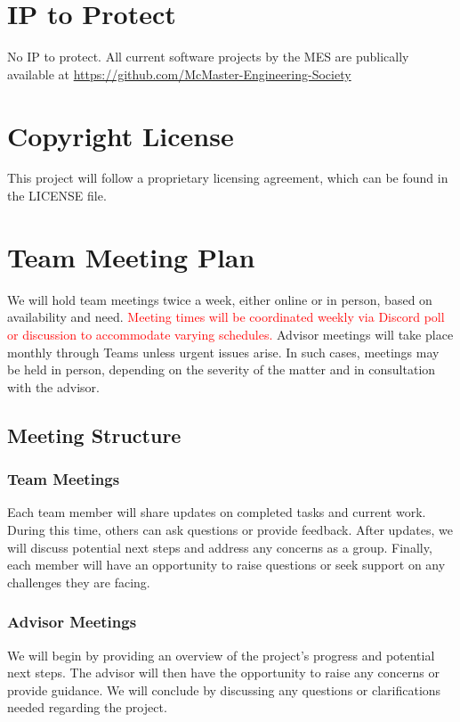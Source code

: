 \documentclass{article}
\begin{document}
\section{IP to Protect}
No IP to protect. All current software projects by the MES are publically available at \href{https://github.com/McMaster-Engineering-Society}{https://github.com/McMaster-Engineering-Society}


\section{Copyright License}
This project will follow a proprietary licensing agreement, which can be found in the LICENSE file.

\section{Team Meeting Plan}

We will hold team meetings twice a week, either online or in person, based on availability and need. \textcolor{red}{Meeting times will be coordinated weekly via Discord poll or discussion to accommodate varying schedules.} Advisor meetings will take place monthly through Teams unless urgent issues arise. In such cases, meetings may be held in person, depending on the severity of the matter and in consultation with the advisor.

\subsection{Meeting Structure}

\subsubsection{Team Meetings}
Each team member will share updates on completed tasks and current work. During this time, others can ask questions or provide feedback. After updates, we will discuss potential next steps and address any concerns as a group. Finally, each member will have an opportunity to raise questions or seek support on any challenges they are facing.

\subsubsection{Advisor Meetings}
We will begin by providing an overview of the project’s progress and potential next steps. The advisor will then have the opportunity to raise any concerns or provide guidance. We will conclude by discussing any questions or clarifications needed regarding the project.
\end{document}
